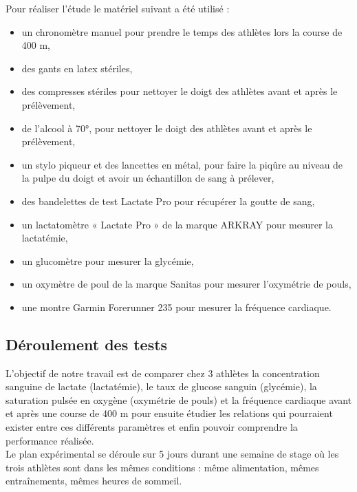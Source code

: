                 Pour réaliser l'étude le matériel suivant a été utilisé : 
                
                \begin{itemize}
                    \item un chronomètre manuel pour prendre le temps des athlètes lors la course de 400 m,
                    \item des gants en latex stériles,
                    \item des compresses stériles pour nettoyer le doigt des athlètes avant et après le prélèvement,
                    \item de l'alcool à 70°, pour nettoyer le doigt des athlètes avant et après le prélèvement,  
                    \item un stylo piqueur et des lancettes en métal, pour faire la piqûre au niveau de la pulpe du doigt et avoir un échantillon de sang à prélever,
                    \item des bandelettes de test Lactate Pro pour récupérer la goutte de sang,
                    \item un lactatomètre « Lactate Pro » de la marque ARKRAY pour mesurer la lactatémie,
                    \item un glucomètre pour mesurer la glycémie,
                    \item un oxymètre de poul de la marque Sanitas pour mesurer l'oxymétrie de pouls,
                    \item une montre Garmin Forerunner 235 pour mesurer la fréquence cardiaque.\\
                \end{itemize}
        
    
        \subsection {Déroulement des tests}
        
            L'objectif de notre travail est de comparer chez 3 athlètes la concentration sanguine de lactate (lactatémie), le taux de glucose sanguin (glycémie), la saturation pulsée en oxygène (oxymétrie de pouls) et la fréquence cardiaque avant et après une course de 400 m pour ensuite étudier les relations qui pourraient exister entre ces différents paramètres et enfin pouvoir comprendre la performance réalisée. \\
            
            Le plan expérimental se déroule sur 5 jours durant une semaine de stage où les trois athlètes sont dans les mêmes conditions : même alimentation, mêmes entraînements, mêmes heures de sommeil. \\
            
